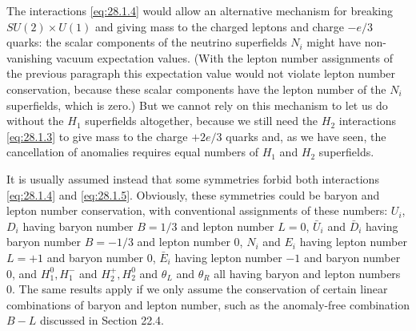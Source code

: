 The interactions \eqref{eq:28.1.4} would allow an alternative mechanism
for breaking \(SU(2)\times U(1)\) and giving mass to the charged
leptons and charge \(-e/3\) quarks: the scalar components of the neutrino
superfields \(N_i\) might have non-vanishing vacuum expectation values.
(With the lepton number assignments of the previous paragraph this
expectation value would not violate lepton number conservation, because
these scalar components have the lepton number of the \(N_i\)
superfields, which is zero.) But we cannot rely on this mechanism to let
us do without the \(H_1\) superfields altogether, because we still need
the \(H_2\) interactions \eqref{eq:28.1.3} to give mass to the charge
\(+2e/3\) quarks and, as we have seen, the cancellation of anomalies
requires equal numbers of \(H_1\) and \(H_2\) superfields.

It is usually assumed instead that some symmetries forbid both
interactions \eqref{eq:28.1.4} and \eqref{eq:28.1.5}. Obviously, these
symmetries could be baryon and lepton number conservation, with
conventional assignments of these numbers: \(U_i\), \(D_i\) having
baryon number \(B=1/3\) and lepton number \(L=0\), \(\bar U_i\) and
\(\bar D_i\) having baryon number \(B=-1/3\) and lepton number 0,
\(N_i\) and \(E_i\) having lepton number \(L=+1\) and baryon number 0,
\(\bar E_i\) having lepton number \(-1\) and baryon number 0, and
\(H_1^0,H_1^-\) and \(H_2^+,H_2^0\) and \(\theta_L\) and \(\theta_R\)
all having baryon and lepton numbers 0. The same results apply if we
only assume the conservation of certain linear combinations of baryon
and lepton number, such as the anomaly-free combination \(B-L\)
discussed in Section 22.4.

